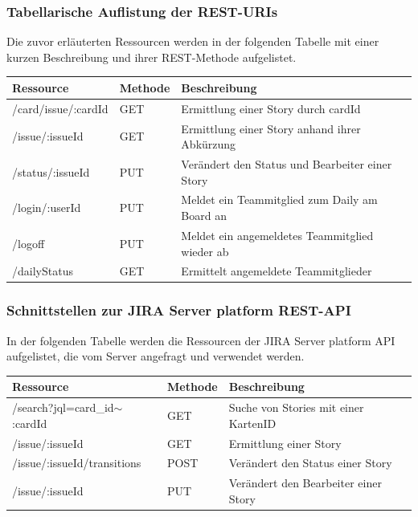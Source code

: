 \documentclass[12pt,titlepage]{scrartcl}
\begin{document}
			\subsubsection{Tabellarische Auflistung der REST-URIs}
			Die zuvor erläuterten Ressourcen werden in der folgenden Tabelle mit einer kurzen Beschreibung und ihrer REST-Methode aufgelistet. 
			\begin{table}[H]
\begin{tabular}{|l|l|l|}
\hline
\textbf{Ressource}  & \textbf{Methode} & \textbf{Beschreibung}                                 \\ \hline
/card/issue/:cardId & GET              & Ermittlung einer Story durch cardId \\ \hline
/issue/:issueId       & GET              & Ermittlung einer Story anhand ihrer Abkürzung         \\ \hline
/status/:issueId      & PUT              & Verändert den Status und Bearbeiter einer Story       \\ \hline
/login/:userId      & PUT              & Meldet ein Teammitglied zum Daily am Board an         \\ \hline
/logoff             & PUT              & Meldet ein angemeldetes Teammitglied wieder ab         \\ \hline
/dailyStatus        & GET              & Ermittelt angemeldete Teammitglieder \\ \hline
\end{tabular}
\end{table}
			\subsubsection{Schnittstellen zur JIRA Server platform REST-API}
			In der folgenden Tabelle werden die Ressourcen der JIRA Server platform API aufgelistet, die vom Server angefragt und verwendet werden.
			\begin{table}[H]
\begin{tabular}{|l|l|l|}
\hline
\textbf{Ressource}                & \textbf{Methode} & \textbf{Beschreibung}                         \\ \hline
/search?jql=card\_id$\sim$:cardId & GET              & Suche von Stories mit einer KartenID          \\ \hline
/issue/:issueId                   & GET              & Ermittlung einer Story  \\ \hline
/issue/:issueId/transitions       & POST             & Verändert den Status einer Story              \\ \hline
/issue/:issueId                   & PUT              & Verändert den Bearbeiter einer Story          \\ \hline
\end{tabular}
\end{table}
			\newpage
\end{document}

